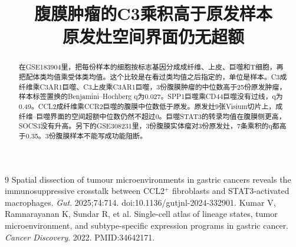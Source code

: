 \documentclass[12pt,a4paper,fontset=none]{ctexart}
\title{腹膜肿瘤的C3乘积高于原发样本\\原发灶空间界面仍无超额}
\author{}
\date{}
\begin{document}
\maketitle
\begin{abstract}
在GSE183904里，把每份样本的细胞按标志基因分成成纤维、上皮、巨噬和T细胞，再把配体类均值乘受体类均值。这个比较是在看过类均值之后指定的，单位是样本。C3成纤维乘C3AR1巨噬、C3上皮乘C3AR1巨噬，3份腹膜肿瘤的中位数高于25份原发肿瘤，样本标签置换的Benjamini--Hochberg q为0.027。SPP1巨噬乘CD44巨噬没有过线，q为0.49。CCL2成纤维乘CCR2巨噬的腹膜中位数低于原发。原发灶9张Visium切片上，成纤维--巨噬界面的空间超额中位数仍然不超过0。巨噬STAT3的转录均值在腹膜侧更高，SOCS3没有升高。另下的GSE308231里，3份腹膜实体瘤对3份原发灶，7条乘积的q都高于0.35。3份腹膜样本不能写成功能阻断。
\end{abstract}

\tableofcontents
\clearpage













\begin{thebibliography}{9}
Spatial dissection of tumour microenvironments in gastric cancers reveals the immunosuppressive crosstalk between CCL2$^{+}$ fibroblasts and STAT3-activated macrophages.
\textit{Gut}. 2025;74:714.
doi:10.1136/gutjnl-2024-332901.
Kumar V, Ramnarayanan K, Sundar R, et al.
Single-cell atlas of lineage states, tumor microenvironment, and subtype-specific expression programs in gastric cancer.
\textit{Cancer Discovery}. 2022.
PMID:34642171.
\end{thebibliography}
\end{document}
